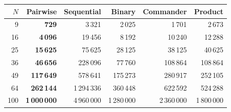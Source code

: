 \begin{tabular}{rrrrrr}
\toprule
$N$ & Pairwise & Sequential & Binary & Commander & Product \\
\midrule
9 & \textbf{729} & 3\,321 & 2\,025 & 1\,701 & 2\,673 \\
16 & \textbf{4\,096} & 19\,456 & 8\,192 & 10\,240 & 12\,288 \\
25 & \textbf{15\,625} & 75\,625 & 28\,125 & 38\,125 & 40\,625 \\
36 & \textbf{46\,656} & 228\,096 & 77\,760 & 108\,864 & 108\,864 \\
49 & \textbf{117\,649} & 578\,641 & 175\,273 & 280\,917 & 252\,105 \\
64 & \textbf{262\,144} & 1\,294\,336 & 360\,448 & 622\,592 & 524\,288 \\
100 & \textbf{1\,000\,000} & 4\,960\,000 & 1\,280\,000 & 2\,360\,000 & 1\,800\,000 \\
\bottomrule
\end{tabular}
